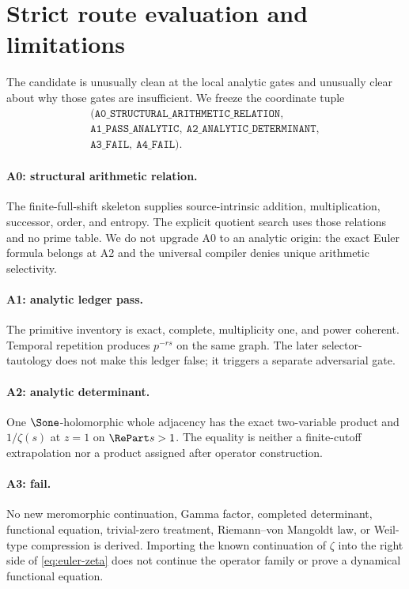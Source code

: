 \section{Strict route evaluation and limitations}
\label{sec:route}

The candidate is unusually clean at the local analytic gates and unusually
clear about why those gates are insufficient.  We freeze the coordinate
tuple
\[
\boxed{
\begin{gathered}
(\texttt{A0\_STRUCTURAL\_ARITHMETIC\_RELATION},\\
\texttt{A1\_PASS\_ANALYTIC},
\ \texttt{A2\_ANALYTIC\_DETERMINANT},\\
\texttt{A3\_FAIL},\ \texttt{A4\_FAIL}).
\end{gathered}}
\]

\paragraph{A0: structural arithmetic relation.}
The finite-full-shift skeleton supplies source-intrinsic addition,
multiplication, successor, order, and entropy.  The explicit quotient search
uses those relations and no prime table.  We do not upgrade A0 to an analytic
origin: the exact Euler formula belongs at A2 and the universal compiler
denies unique arithmetic selectivity.

\paragraph{A1: analytic ledger pass.}
The primitive inventory is exact, complete, multiplicity one, and power
coherent.  Temporal repetition produces $p^{-rs}$ on the same graph.  The
later selector-tautology does not make this ledger false; it triggers a
separate adversarial gate.

\paragraph{A2: analytic determinant.}
One $\Sone$-holomorphic whole adjacency has the exact two-variable product
and $1/\zeta(s)$ at $z=1$ on $\RePart s>1$.  The equality is neither a
finite-cutoff extrapolation nor a product assigned after operator
construction.

\paragraph{A3: fail.}
No new meromorphic continuation, Gamma factor, completed determinant,
functional equation, trivial-zero treatment, Riemann--von Mangoldt law, or
Weil-type compression is derived.  Importing the known continuation of
$\zeta$ into the right side of \eqref{eq:euler-zeta} does not continue the
operator family or prove a dynamical functional equation.

